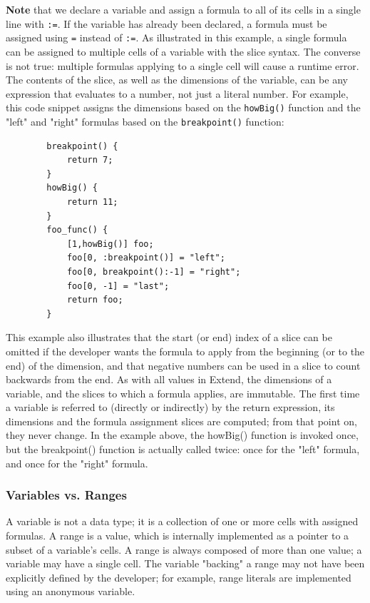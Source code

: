 	\medskip \noindent
	\textbf{Note} that we declare a variable and assign a formula to all of its cells in a single line with \texttt{:=}. If the variable has already been declared, a formula must be assigned using \texttt{=} instead of \texttt{:=}. As illustrated in this example, a single formula can be assigned to multiple cells of a variable with the slice syntax. The converse is not true: multiple formulas applying to a single cell will cause a runtime error. The contents of the slice, as well as the dimensions of the variable, can be any expression that evaluates to a number, not just a literal number. For example, this code snippet assigns the dimensions based on the \texttt{howBig()} function and the "left" and "right" formulas based on the \texttt{breakpoint()} function:

	\begin{lstlisting}
		breakpoint() {
			return 7;
		}
		howBig() {
			return 11;
		}
		foo_func() {
			[1,howBig()] foo;
			foo[0, :breakpoint()] = "left";
			foo[0, breakpoint():-1] = "right";
			foo[0, -1] = "last";
			return foo;
		}
	\end{lstlisting}

	\medskip \noindent
	This example also illustrates that the start (or end) index of a slice can be omitted if the developer wants the formula to apply from the beginning (or to the end) of the dimension, and that negative numbers can be used in a slice to count backwards from the end. As with all values in Extend, the dimensions of a variable, and the slices to which a formula applies, are immutable. The first time a variable is referred to (directly or indirectly) by the return expression, its dimensions and the formula assignment slices are computed; from that point on, they never change. In the example above, the howBig() function is invoked once, but the breakpoint() function is actually called twice: once for the "left" formula, and once for the "right" formula.

		\subsubsection{Variables vs. Ranges}
		A variable is not a data type; it is a collection of one or more cells with assigned formulas. A range is a value, which is internally implemented as a pointer to a subset of a variable's cells. A range is always composed of more than one value; a variable may have a single cell. The variable "backing" a range may not have been explicitly defined by the developer; for example, range literals are implemented using an anonymous variable.

